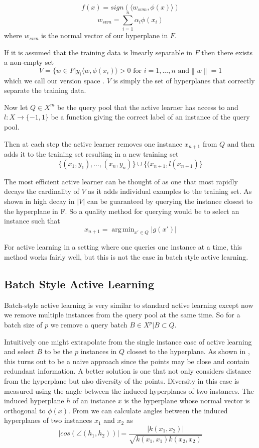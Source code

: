 \documentclass{article}
\newcommand\norm[1]{\left\lVert#1\right\rVert}
\DeclareMathOperator*{\argmin}{arg\,min}
\begin{document}
\[
f(x) = sign(\langle w_{svm}, \phi(x) \rangle)
\]
\[
w_{svm} = \sum_{i=1}^n \alpha_i \phi(x_i)
\]
where $w_{svm}$ is the normal vector of our hyperplane in $F$. 

If it is assumed that the training data is linearly separable in $F$ then there exists a non-empty set
\[
V = \{w \in F | y_i \langle w, \phi(x_i) \rangle > 0 \text{ for } i = 1, ...,n \text{ and} \norm{w} = 1
\]
which we call our version space \cite{version_space}. $V$ is simply the set of hyperplanes that correctly separate the training data.

Now let $Q \in X^m$ be the query pool that the active learner has access to and
$l : X \rightarrow \{-1,1\}$ be a function giving the correct label of an instance of the query pool.

Then at each step the active learner removes one instance $x_{n+1}$ from $Q$ and then adds it to the training set resulting in a new training set
\[
\{(x_1, y_1),...,(x_n,y_n)\}\cup\{(x_{n+1}, l(x_{n+1})\}
\]


The most efficient active learner can be thought of as one that most rapidly decays the cardinality of $V$ as it adds individual examples to the training set. As shown in \cite{active_learning} high decay in $|V|$ can be guaranteed by querying the instance closest to the hyperplane in F. So a quality method for querying would be to select an instance such that
\[
x_{n+1} = \argmin_{x' \in Q} |g(x')|
\]

For active learning in a setting where one queries one instance at a time, this method works fairly well, but this is not the case in batch style active learning. 

\subsection*{Batch Style Active Learning}

Batch-style active learning is very similar to standard active learning except now we remove multiple instances from the query pool at the same time. So for a batch size of $p$ we remove a query batch
$B \in X^p | B \subset Q$.


Intuitively one might extrapolate from the single instance case of active learning and select $B$ to be the $p$ instances in $Q$ closest to the hyperplane. As shown in \cite{active_learning}, this turns out to be a naive approach since the points may be close and contain redundant information. A better solution is one that not only considers distance from the hyperplane but also diversity of the points. Diversity in this case is measured using the angle between the induced hyperplanes of two instances. The induced hyperplane $h$ of an instance $x$ is the hyperplane whose normal vector is orthogonal to $\phi(x)$. From \cite{active_learning} we can calculate angles between the induced hyperplanes of two instances $x_1$ and $x_2$ as
\[
|cos(\angle(h_1, h_2))| = \frac{|k(x_1,x_2)|}{\sqrt{k(x_1,x_1)k(x_2, x_2)}}
\]
\end{document}
